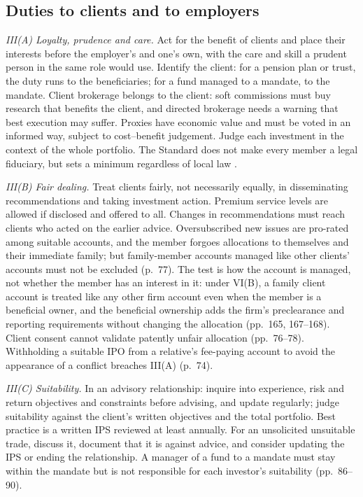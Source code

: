 \subsection{Duties to clients and to employers}

\begin{qfrule}\label{rule:standard-duties-to-clients}
 \emph{III(A) Loyalty, prudence and care.} Act for the benefit of clients and place their interests before the employer's and one's own, with the care and skill a prudent person in the same role would use. Identify the client: for a pension plan or trust, the duty runs to the beneficiaries; for a fund managed to a mandate, to the mandate. Client brokerage belongs to the client: soft commissions must buy research that benefits the client, and directed brokerage needs a warning that best execution may suffer. Proxies have economic value and must be voted in an informed way, subject to cost--benefit judgement. Judge each investment in the context of the whole portfolio. The Standard does not make every member a legal fiduciary, but sets a minimum regardless of local law \citep[pp.~65--70]{standards-practice-handbook-2024}.

\emph{III(B) Fair dealing.} Treat clients fairly, not necessarily equally, in disseminating recommendations and taking investment action. Premium service levels are allowed if disclosed and offered to all. Changes in recommendations must reach clients who acted on the earlier advice. Oversubscribed new issues are pro-rated among suitable accounts, and the member forgoes allocations to themselves and their immediate family; but family-member accounts managed like other clients' accounts must not be excluded (p.~77). The test is how the account is managed, not whether the member has an interest in it: under VI(B), a family client account is treated like any other firm account even when the member is a beneficial owner, and the beneficial ownership adds the firm's preclearance and reporting requirements without changing the allocation (pp.~165, 167--168). Client consent cannot validate patently unfair allocation (pp.~76--78). Withholding a suitable IPO from a relative's fee-paying account to avoid the appearance of a conflict breaches III(A) (p.~74).

\emph{III(C) Suitability.} In an advisory relationship: inquire into experience, risk and return objectives and constraints before advising, and update regularly; judge suitability against the client's written objectives and the total portfolio. Best practice is a written IPS reviewed at least annually. For an unsolicited unsuitable trade, discuss it, document that it is against advice, and consider updating the IPS or ending the relationship. A manager of a fund to a mandate must stay within the mandate but is not responsible for each investor's suitability (pp.~86--90).


\end{qfrule}
